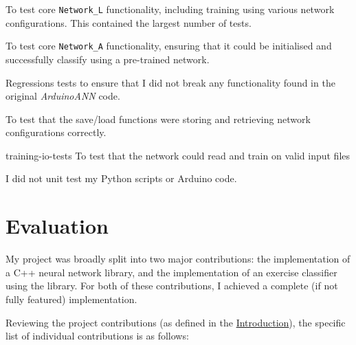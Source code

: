 \documentclass[a4paper]{article}
\begin{document}
\begin{description}
\item[network-linux-core-tests] To test core \lstinline{Network_L} functionality, including training using various network configurations. This contained the largest number of tests.
\item[network-arduino-core-tests] To test core \lstinline{Network_A} functionality, ensuring that it could be initialised and successfully classify using a pre-trained network.
\item[network-linux-legacy-tests] Regressions tests to ensure that I did not break any functionality found in the original \textit{ArduinoANN} code.
\item[network-linux-io-tests] To test that the save/load functions were storing and retrieving network configurations correctly.
\item{training-io-tests} To test that the network could read and train on valid input files
\end{description}

I did not unit test my Python scripts or Arduino code.

\newpage
\section{Evaluation}
\label{sec:ev}

My project was broadly split into two major contributions: the implementation of a C++ neural network library, and the implementation of an exercise classifier using the library. For both of these contributions, I achieved a complete (if not fully featured) implementation.

Reviewing the project contributions (as defined in the \hyperref[subsec:in_cs]{Introduction}), the specific list of individual contributions is as follows:
\end{document}
